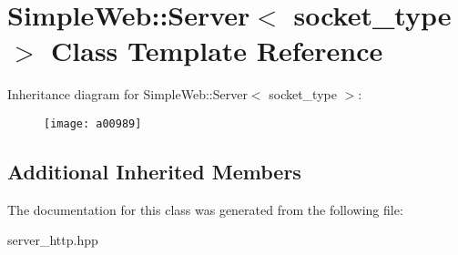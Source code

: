 \hypertarget{a00989}{}\section{Simple\+Web\+:\+:Server$<$ socket\+\_\+type $>$ Class Template Reference}
\label{a00989}
Inheritance diagram for Simple\+Web\+:\+:Server$<$ socket\+\_\+type $>$\+:\begin{figure}[H]
\begin{center}
\leavevmode
\texttt{[image: a00989]}
\end{center}
\end{figure}
\subsection*{Additional Inherited Members}


The documentation for this class was generated from the following file\+:\begin{DoxyCompactItemize}
\item 
server\+\_\+http.\+hpp\end{DoxyCompactItemize}
